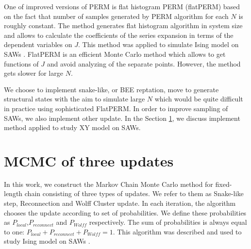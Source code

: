 One of improved versions  of PERM is flat histogram PERM (flatPERM) based on the fact that number of samples generated by PERM algorithm for each $N$ is roughly constant. The method generates flat histogram algorithm in system size and allows to calculate the coefficients of the series expansion in terms of the dependent variables on $J$. This method was applied to simulate Ising model on SAWs \cite{PhysRevE.104.024122}. FlatPERM is an efficient Monte Carlo method which allows to get functions of $J$ and avoid analyzing of the separate points. However, the method gets slower for large $N$.

We choose to implement snake-like, or BEE reptation, move to generate structural states with the aim to simulate large $N$ which would be quite difficult in practice using sophisticated FlatPERM. In order to improve sampling of SAWs, we also implement other update. In the Section \ref{sec:myalgorithm}, we discuss implement method applied to study XY model on SAWs. 


\section{MCMC of three updates} \label{sec:myalgorithm}
In this work, we construct the Markov Chain Monte Carlo method for fixed-length chain consisting of three types of updates. We refer to them as Snake-like step, Reconnection and Wolff Cluster update. In each iteration, the algorithm chooses the update according to set of probabilities. We define these probabilities as $P_{local}$,$P_{reconnect}$ and $P_{Wolff}$ respectively. The sum of probabilities is always equal to one: $P_{local} + P_{reconnect} + P_{Wolff} = 1$. This algorithm was described and used to study Ising model on SAWs \cite{PhysRevE.104.054501}. 


